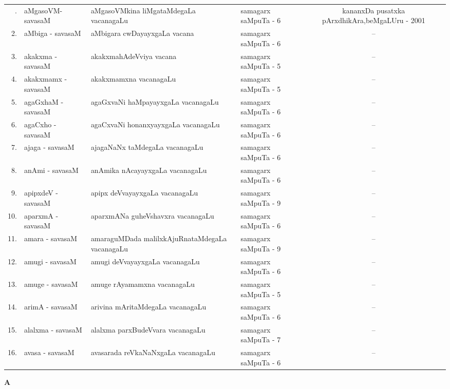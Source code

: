 {\renewcommand{\arraystretch}{1.35}
\begin{longtable}{rl>{\raggedright}p{5.5cm}lc}
\endfirsthead
\endhead
\endfoot
\endlastfoot
1. & aMgasoVM-savasaM & aMgasoVMkina liMgataMdegaLa vacanagaLu & samagarx saMpuTa - 6 & \multicolumn{1}{p{3.5cm}}{kananxDa pusatxka pArxdhikAra,\newline beMgaLUru - 2001}\\
2. & aMbiga - savasaM & aMbigara cwDayayxgaLa vacana & samagarx saMpuTa - 6 & --\\
3. & akakxma - savasaM & akakxmahAdeVviya vacana & samagarx saMpuTa - 5 & --\\
4. & akakxmamx - savasaM & akakxmamxna vacanagaLu & samagarx saMpuTa - 5 & --\\
5. & agaGxhaM - savasaM & agaGxvaNi haMpayayxgaLa vacanagaLu & samagarx saMpuTa - 6 & --\\
6. & agaCxho - savasaM & agaCxvaNi honanxyayxgaLa vacanagaLu & samagarx saMpuTa - 6 & --\\
7. & ajaga - savasaM & ajagaNaNx taMdegaLa vacanagaLu & samagarx saMpuTa - 6 & --\\
8. & anAmi - savasaM & anAmika nAcayayxgaLa vacanagaLu & samagarx saMpuTa - 6 & --\\
9. & apipxdeV - savasaM & apipx deVvayayxgaLa vacanagaLu & samagarx saMpuTa - 9 & --\\
10. & aparxmA - savasaM & aparxmANa guheVshavxra vacanagaLu & samagarx saMpuTa - 6 & --\\
11. & amara - savasaM & amaraguMDada malilxkAjuRna\newline taMdegaLa vacanagaLu & samagarx saMpuTa - 9 & --\\
12. & amugi - savasaM & amugi deVvayayxgaLa vacanagaLu & samagarx saMpuTa - 6 & --\\
13. & amuge - savasaM & amuge rAyamamxna vacanagaLu & samagarx saMpuTa - 5 & --\\
14. & arimA - savasaM & arivina mAritaMdegaLa vacanagaLu & samagarx saMpuTa - 6 & --\\
15. & alalxma - savasaM & alalxma parxBudeVvara vacanagaLu & samagarx saMpuTa - 7 & --\\
16. & avasa - savasaM &  avasarada reVkaNaNxgaLa vacanagaLu & samagarx saMpuTa - 6 & --\\
\end{longtable}}
\bigskip

\centerline{\bf A}

\medskip

